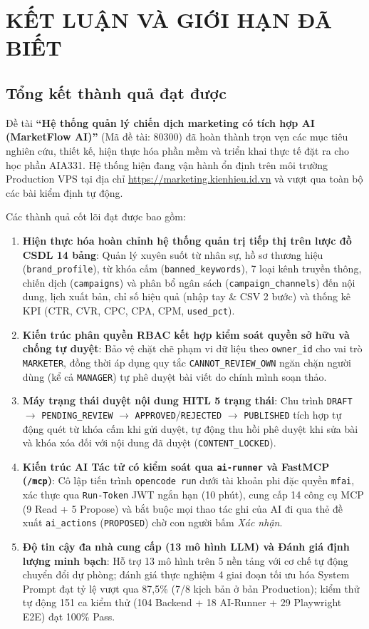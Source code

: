 \chapter{KẾT LUẬN VÀ GIỚI HẠN ĐÃ BIẾT}

\section{Tổng kết thành quả đạt được}

Đề tài \textbf{``Hệ thống quản lý chiến dịch marketing có tích hợp AI (MarketFlow AI)''} (Mã đề tài: 80300) đã hoàn thành trọn vẹn các mục tiêu nghiên cứu, thiết kế, hiện thực hóa phần mềm và triển khai thực tế đặt ra cho học phần AIA331. Hệ thống hiện đang vận hành ổn định trên môi trường Production VPS tại địa chỉ \url{https://marketing.kienhieu.id.vn} và vượt qua toàn bộ các bài kiểm định tự động.

Các thành quả cốt lõi đạt được bao gồm:
\begin{enumerate}[noitemsep,topsep=2pt]
 \item \textbf{Hiện thực hóa hoàn chỉnh hệ thống quản trị tiếp thị trên lược đồ CSDL 14 bảng}: Quản lý xuyên suốt từ nhân sự, hồ sơ thương hiệu (\texttt{brand\_profile}), từ khóa cấm (\texttt{banned\_keywords}), 7 loại kênh truyền thông, chiến dịch (\texttt{campaigns}) và phân bổ ngân sách (\texttt{campaign\_channels}) đến nội dung, lịch xuất bản, chỉ số hiệu quả (nhập tay \& CSV 2 bước) và thống kê KPI (CTR, CVR, CPC, CPA, CPM, \texttt{used\_pct}).
 \item \textbf{Kiến trúc phân quyền RBAC kết hợp kiểm soát quyền sở hữu và chống tự duyệt}: Bảo vệ chặt chẽ phạm vi dữ liệu theo \texttt{owner\_id} cho vai trò \texttt{MARKETER}, đồng thời áp dụng quy tắc \texttt{CANNOT\_REVIEW\_OWN} ngăn chặn người dùng (kể cả \texttt{MANAGER}) tự phê duyệt bài viết do chính mình soạn thảo.
 \item \textbf{Máy trạng thái duyệt nội dung HITL 5 trạng thái}: Chu trình \texttt{DRAFT} $\rightarrow$ \texttt{PENDING\_REVIEW} $\rightarrow$ \texttt{APPROVED}/\texttt{REJECTED} $\rightarrow$ \texttt{PUBLISHED} tích hợp tự động quét từ khóa cấm khi gửi duyệt, tự động thu hồi phê duyệt khi sửa bài và khóa xóa đối với nội dung đã duyệt (\texttt{CONTENT\_LOCKED}).
 \item \textbf{Kiến trúc AI Tác tử có kiểm soát qua \texttt{ai-runner} và FastMCP (\texttt{/mcp})}: Cô lập tiến trình \texttt{opencode run} dưới tài khoản phi đặc quyền \texttt{mfai}, xác thực qua \texttt{Run-Token} JWT ngắn hạn (10 phút), cung cấp 14 công cụ MCP (9 Read + 5 Propose) và bắt buộc mọi thao tác ghi của AI đi qua thẻ đề xuất \texttt{ai\_actions} (\texttt{PROPOSED}) chờ con người bấm \textit{Xác nhận}.
 \item \textbf{Độ tin cậy đa nhà cung cấp (13 mô hình LLM) và Đánh giá định lượng minh bạch}: Hỗ trợ 13 mô hình trên 5 nền tảng với cơ chế tự động chuyển đổi dự phòng; đánh giá thực nghiệm 4 giai đoạn tối ưu hóa System Prompt đạt tỷ lệ vượt qua 87,5\% (7/8 kịch bản ở bản Production); kiểm thử tự động 151 ca kiểm thử (104 Backend + 18 AI-Runner + 29 Playwright E2E) đạt 100\% Pass.
\end{enumerate}

